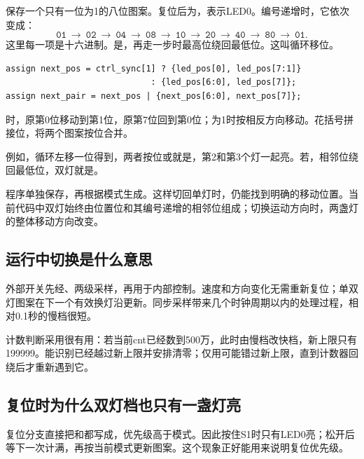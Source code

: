 保存一个只有一位为1的八位图案。复位后为，表示LED0。编号递增时，它依次变成：
\[
\texttt{01}\ \to\ \texttt{02}\ \to\ \texttt{04}\ \to\ \texttt{08}\ \to\ \texttt{10}\ \to\ \texttt{20}\ \to\ \texttt{40}\ \to\ \texttt{80}\ \to\ \texttt{01}.
\]
这里每一项是十六进制。是，再走一步时最高位绕回最低位。这叫循环移位。
\begin{lstlisting}
assign next_pos = ctrl_sync[1] ? {led_pos[0], led_pos[7:1]}
                             : {led_pos[6:0], led_pos[7]};
assign next_pair = next_pos | {next_pos[6:0], next_pos[7]};
\end{lstlisting}
时，原第0位移动到第1位，原第7位回到第0位；为1时按相反方向移动。花括号拼接位，\code{|}将两个图案按位合并。

例如，循环左移一位得到，两者按位或就是，第2和第3个灯一起亮。若，相邻位绕回最低位，双灯就是。

程序单独保存，再根据模式生成。这样切回单灯时，仍能找到明确的移动位置。当前代码中双灯始终由位置位和其编号递增的相邻位组成；切换运动方向时，两盏灯的整体移动方向改变。

\subsection{运行中切换是什么意思}
外部开关先经、两级采样，再用于内部控制。速度和方向变化无需重新复位；单双灯图案在下一个有效换灯沿更新。同步采样带来几个时钟周期以内的处理过程，相对0.1秒的慢档很短。

计数判断采用\code{>=}很有用：若当前cnt已经数到500万，此时由慢档改快档，新上限只有199999。\code{>=}能识别已经越过新上限并安排清零；仅用\code{==}可能错过新上限，直到计数器回绕后才重新遇到它。

\subsection{复位时为什么双灯档也只有一盏灯亮}
复位分支直接把和都写成，优先级高于模式。因此按住S1时只有LED0亮；松开后等下一次计满，再按当前模式更新图案。这个现象正好能用来说明复位优先级。

